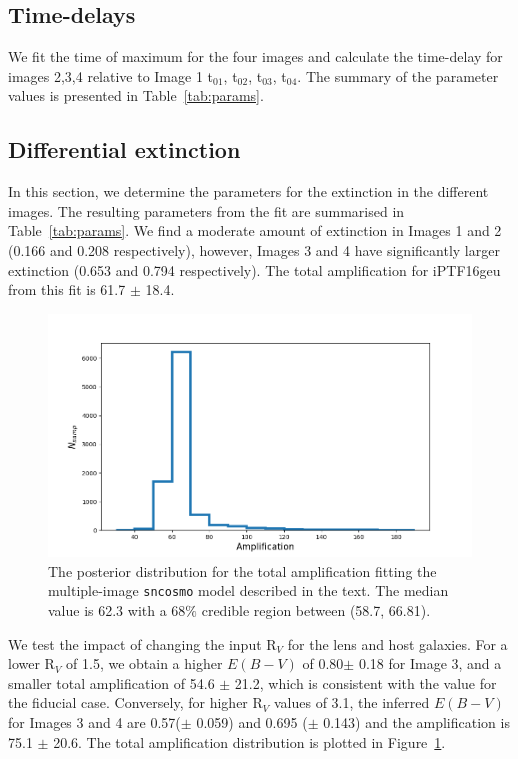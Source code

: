 \documentclass[a4paper,fleqn,usenatbib]{mnras}
\begin{document}




\subsection{Time-delays}
\label{ssec-time_delay}
We fit the time of maximum for the four images and calculate the time-delay for images 2,3,4 relative to Image 1  t$_{01}$, t$_{02}$, t$_{03}$, t$_{04}$. The summary of the parameter values is presented in Table~\ref{tab:params}. 

\subsection{Differential extinction}
\label{ssec-extinction}
In this section, we determine the parameters for the extinction in the different images. The resulting parameters from the fit are summarised in Table~\ref{tab:params}. We find a moderate amount of extinction in Images 1 and 2 (0.166 and 0.208 respectively), however, Images 3 and 4 have significantly larger extinction (0.653 and 0.794 respectively). The total amplification for iPTF16geu from this fit is 61.7 $\pm$ 18.4.

\begin{figure}
    \centering
    \includegraphics[width=.5\textwidth]{amplification_Rv2.png}
    \caption{The posterior distribution for the total amplification fitting the multiple-image \texttt{sncosmo} model described in the text. The median value is 62.3 with a 68$\%$ credible region between (58.7, 66.81).}
    \label{fig:amp}
\end{figure}

We test the impact of changing the input R$_V$ for the lens and host galaxies. For a lower R$_V$ of 1.5, we obtain a higher $E(B-V)$ of 0.80$\pm$ 0.18 for Image 3, and a smaller total amplification of 54.6 $\pm$ 21.2, which is consistent with the value for the fiducial case. Conversely, for higher R$_V$ values of 3.1, the inferred $E(B-V)$ for Images 3 and 4 are 0.57($\pm$ 0.059) and 0.695 ($\pm$ 0.143) and the amplification is 75.1 $\pm$ 20.6. The total amplification distribution is plotted in Figure~\ref{fig:amp}. 
\end{document}
